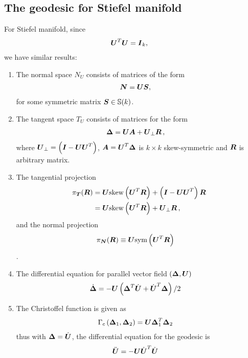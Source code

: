 \documentclass[11pt]{article}
\begin{document}
\subsection{The geodesic for Stiefel manifold}
For Stiefel manifold, since 
\begin{align*}
\boldsymbol{U}^{T}\boldsymbol{U} &= \boldsymbol{I}_{k},
\end{align*} we have similar results:
\begin{enumerate}
\item The normal space $N_{U}$ consists of matrices of the form
\begin{align}
\boldsymbol{N} &= \boldsymbol{U}\boldsymbol{S}, \label{eqn: normal_form_stiefel}
\end{align} for some symmetric matrix $\boldsymbol{S} \in {\mathbb S}(k)$.

\item The tangent space $T_{U}$ consists of matrices for the form
\begin{align}
\boldsymbol{\Delta} &= \boldsymbol{U}\boldsymbol{A}  + \boldsymbol{U}_{\bot}\boldsymbol{R}\,, \label{eqn: tangent_form_stiefel}
\end{align}
where $\boldsymbol{U}_{\bot} = \left(\boldsymbol{I} - \boldsymbol{U}\boldsymbol{U}^{T}\right)$, $\boldsymbol{A} = \boldsymbol{U}^{T}\boldsymbol{\Delta}$ is $k\times k$ skew-symmetric and $\boldsymbol{R}$ is arbitrary matrix. 

\item The tangential projection 
\begin{align}
\pi_{\boldsymbol{T}}(\boldsymbol{R}) &= \boldsymbol{U}\text{skew}\left(\boldsymbol{U}^{T}\boldsymbol{R} \right) + \left(\boldsymbol{I} - \boldsymbol{U}\boldsymbol{U}^{T}\right)\boldsymbol{R}\nonumber\\
&= \boldsymbol{U}\text{skew}\left(\boldsymbol{U}^{T}\boldsymbol{R} \right) + \boldsymbol{U}_{\bot}\boldsymbol{R}\,, \label{eqn: tangent_proj_stiefel} 
\end{align}
and the normal projection
\begin{align}
\pi_{\boldsymbol{N}}(\boldsymbol{R})&\equiv \boldsymbol{U}\text{sym}\left(\boldsymbol{U}^{T}\boldsymbol{R} \right) \label{eqn: normap_proj}
\end{align}.

\item The differential equation for parallel vector field $(\boldsymbol{\Delta}, \boldsymbol{U})$
\begin{align}
\dot{\boldsymbol{\Delta}} &= -\boldsymbol{U}\left( \boldsymbol{\Delta}^{T}\dot{\boldsymbol{U}}+  \dot{\boldsymbol{U}}^{T}\boldsymbol{\Delta} \right)/2 \label{eqn: cov_deriv_eqn_stiefel}
\end{align}

\item The Christoffel function is given as 
\begin{align}
\Gamma_{c}\left(\boldsymbol{\Delta}_{1}, \boldsymbol{\Delta}_{2}\right) &= \boldsymbol{U} \boldsymbol{\Delta}_{1}^{T}\boldsymbol{\Delta}_{2} \label{eqn: Christoffel_ortho_stiefel}
\end{align} thus with $\boldsymbol{\Delta}= \dot{\boldsymbol{U}}$, the differential equation for the geodesic is 
\begin{align}
\ddot{\boldsymbol{U}} &= -\boldsymbol{U} \dot{\boldsymbol{U}}^{T}\dot{\boldsymbol{U}} \label{eqn: diff_geodesic_eqn_general}
\end{align}


\end{enumerate}
\end{document}
